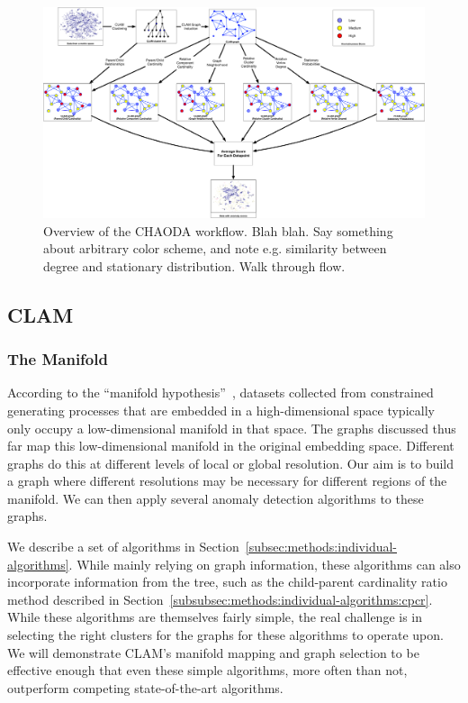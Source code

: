 
\begin{figure}[ht!]
    \centering
    \includegraphics[width=6in]{images/chaoda-workflow.pdf}
    \caption{Overview of the CHAODA workflow.
        Blah blah. Say something about arbitrary color scheme, and note e.g. similarity between degree and stationary distribution. Walk through flow.}
    \label{fig:methods:chaoda-workflow}
\end{figure}


\subsection{CLAM}
\label{subsec:methods:clam}


\subsubsection{The Manifold}
\label{subsubsec:methods:clam:the-manifold}
According to the ``manifold hypothesis''~\cite{fefferman2016testing}, datasets collected from constrained generating processes that are embedded in a high-dimensional space typically only occupy a low-dimensional manifold in that space.
The graphs discussed thus far map this low-dimensional manifold in the original embedding space.
Different graphs do this at different levels of local or global resolution.
Our aim is to build a graph where different resolutions may be necessary for different regions of the manifold.
We can then apply several anomaly detection algorithms to these graphs.

We describe a set of algorithms in Section~\ref{subsec:methods:individual-algorithms}.
While mainly relying on graph information, these algorithms can also incorporate information from the tree, such as the child-parent cardinality ratio method described in Section~\ref{subsubsec:methods:individual-algorithms:cpcr}.
While these algorithms are themselves fairly simple, the real challenge is in selecting the right clusters for the graphs for these algorithms to operate upon.
We will demonstrate CLAM's manifold mapping and graph selection to be effective enough that even these simple algorithms, more often than not, outperform competing state-of-the-art algorithms.


